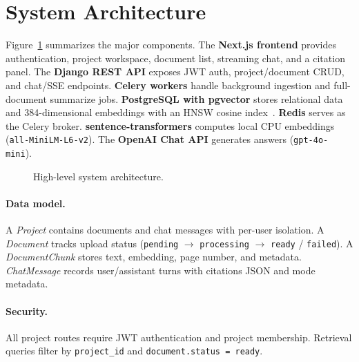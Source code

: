 \documentclass[sigplan,review,anonymous]{acmart}
\begin{document}
\section{System Architecture}
\label{sec:arch}

Figure~\ref{fig:arch} summarizes the major components.
The \textbf{Next.js frontend} provides authentication, project workspace, document list,
streaming chat, and a citation panel.
The \textbf{Django REST API} exposes JWT auth, project/document CRUD, and chat/SSE endpoints.
\textbf{Celery workers} handle background ingestion and full-document summarize jobs.
\textbf{PostgreSQL with pgvector} stores relational data and 384-dimensional embeddings
with an HNSW cosine index~\cite{pgvector2023,johnson2019hnsw}.
\textbf{Redis} serves as the Celery broker.
\textbf{sentence-transformers} computes local CPU embeddings (\texttt{all-MiniLM-L6-v2}).
The \textbf{OpenAI Chat API} generates answers (\texttt{gpt-4o-mini}).

\begin{figure}[t]
  \centering
  \caption{High-level system architecture.}
  \label{fig:arch}
\end{figure}

\paragraph{Data model.}
A \emph{Project} contains documents and chat messages with per-user isolation.
A \emph{Document} tracks upload status (\texttt{pending} $\to$ \texttt{processing} $\to$
\texttt{ready} / \texttt{failed}).
A \emph{DocumentChunk} stores text, embedding, page number, and metadata.
\emph{ChatMessage} records user/assistant turns with citations JSON and mode metadata.

\paragraph{Security.}
All project routes require JWT authentication and project membership.
Retrieval queries filter by \texttt{project\_id} and \texttt{document.status = ready}.
\end{document}
